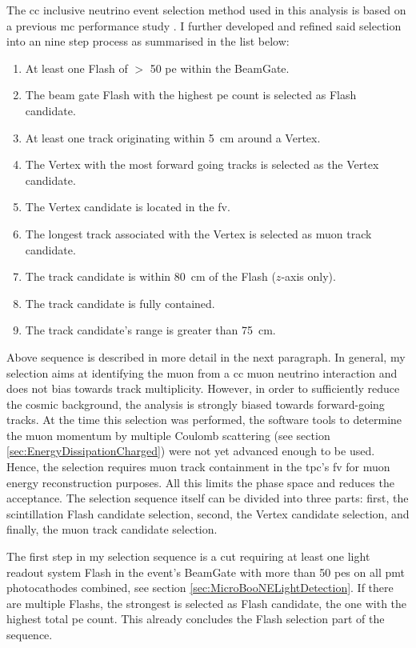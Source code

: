 The \gls{cc} inclusive neutrino event selection method used in this analysis is based on a previous \gls{mc} performance study \cite{MCPerfPublicNote}. I further developed and refined said selection into an nine step process as summarised in the list below:
\begin{enumerate}
    \item At least one \gls{Flash} of $>$ \num{50} \gls{pe} within the \gls{BeamGate}.
    \item The beam gate \gls{Flash} with the highest \gls{pe} count is selected as \gls{Flash} candidate.
    \item At least one track originating within \SI{5}{\centi \metre} around a \gls{Vertex}.
    \item The \gls{Vertex} with the most forward going tracks is selected as the \gls{Vertex} candidate.
    \item The \gls{Vertex} candidate is located in the \gls{fv}.
    \item The longest track associated with the \gls{Vertex} is selected as muon track candidate.
    \item The track candidate is within \SI{80}{\centi \metre} of the \gls{Flash} ($z$-axis only).
    \item The track candidate is fully contained.
    \item The track candidate's range is greater than \SI{75}{\centi \metre}.
\end{enumerate}
Above sequence is described in more detail in the next paragraph. In general, my selection aims at identifying the muon from a \gls{cc} muon neutrino interaction and does not bias towards track multiplicity. However, in order to sufficiently reduce the cosmic background, the analysis is strongly biased towards forward-going tracks. At the time this selection was performed, the software tools to determine the muon momentum by multiple Coulomb scattering (see section \ref{sec:EnergyDissipationCharged}) were not yet advanced enough to be used. Hence, the selection requires muon track containment in the \gls{tpc}'s \gls{fv} for muon energy reconstruction purposes. All this limits the phase space and reduces the acceptance. The selection sequence itself can be divided into three parts: first, the scintillation \gls{Flash} candidate selection, second, the \gls{Vertex} candidate selection, and finally, the muon track candidate selection.

The first step in my selection sequence is a cut requiring at least one light readout system \gls{Flash} in the event's \gls{BeamGate} with more than \num{50} \glspl{pe} on all \gls{pmt} photocathodes combined, see section \ref{sec:MicroBooNELightDetection}. If there are multiple \glspl{Flash}, the strongest is selected as \gls{Flash} candidate, \ie the one with the highest total \gls{pe} count. This already concludes the \gls{Flash} selection part of the sequence.


